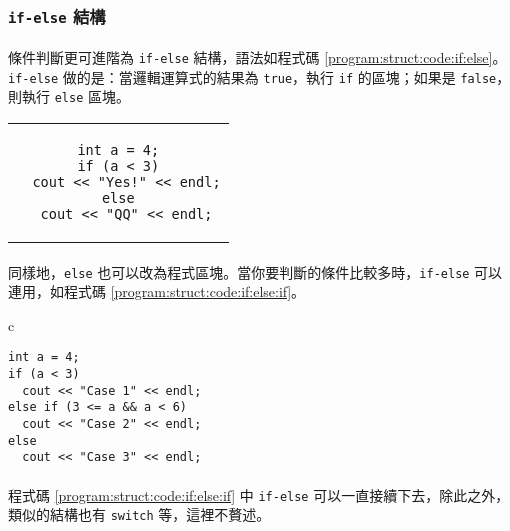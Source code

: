 \documentclass[12pt,a4paper,oneside]{report}
\begin{document}
\begin{CJK}{UTF8}{bkai}
\subsubsection{\lstinline!if!\texttt{-}\lstinline!else! 結構}

\paragraph{}條件判斷更可進階為 \lstinline!if!\texttt{-}\lstinline!else! 結構，語法如程式碼 \ref{program:struct:code:if:else}。\lstinline!if!\texttt{-}\lstinline!else! 做的是：當邏輯運算式的結果為 \lstinline!true!，執行 \lstinline!if! 的區塊；如果是 \lstinline!false!，則執行 \lstinline!else! 區塊。

\begin{code}[h!]
\centering
\begin{tabular}{c}
\begin{lstlisting}
int a = 4;
if (a < 3)
  cout << "Yes!" << endl;
else
  cout << "QQ" << endl;
\end{lstlisting}
\end{tabular}
\caption{\lstinline!if!\texttt{-}\lstinline!else! 結構}
\label{program:struct:code:if:else}
\end{code}

\paragraph{}同樣地，\lstinline!else! 也可以改為程式區塊。當你要判斷的條件比較多時，\lstinline!if!\texttt{-}\lstinline!else! 可以連用，如程式碼 \ref{program:struct:code:if:else:if}。

\begin{code}[h!]
\centering
\begin{tabular}{c}
\begin{lstlisting}
int a = 4;
if (a < 3)
  cout << "Case 1" << endl;
else if (3 <= a && a < 6)
  cout << "Case 2" << endl;
else
  cout << "Case 3" << endl;
\end{lstlisting}
\end{tabular}
\caption{\lstinline!if! 和 \lstinline!else! 連用}
\label{program:struct:code:if:else:if}
\end{code}

\paragraph{}程式碼 \ref{program:struct:code:if:else:if} 中 \lstinline!if!\texttt{-}\lstinline!else! 可以一直接續下去，除此之外，類似的結構也有 \lstinline!switch! 等，這裡不贅述。


\end{CJK}
\end{document}
